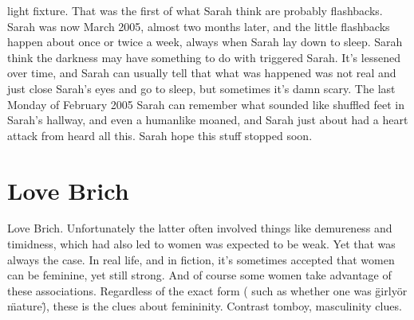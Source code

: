 \documentclass[12pt]{book}
\begin{document}
light fixture. That was the first of what Sarah think are probably flashbacks. Sarah was now March 2005, almost two months later, and the little flashbacks happen about once or twice a week, always when Sarah lay down to sleep. Sarah think the darkness may have something to do with triggered Sarah. It's lessened over time, and Sarah can usually tell that what was happened was not real and just close Sarah's eyes and go to sleep, but sometimes it's damn scary. The last Monday of February 2005 Sarah can remember what sounded like shuffled feet in Sarah's hallway, and even a humanlike moaned, and Sarah just about had a heart attack from heard all this. Sarah hope this stuff stopped soon.



\chapter{Love Brich}

Love Brich. Unfortunately the latter often involved things like demureness and timidness, which had also led to women was expected to be weak. Yet that was always the case. In real life, and in fiction, it's sometimes accepted that women can be feminine, yet still strong. And of course some women take advantage of these associations. Regardless of the exact form ( such as whether one was \"girly\" or \"mature\"), these is the clues about femininity. Contrast tomboy, masculinity clues.
\end{document}
